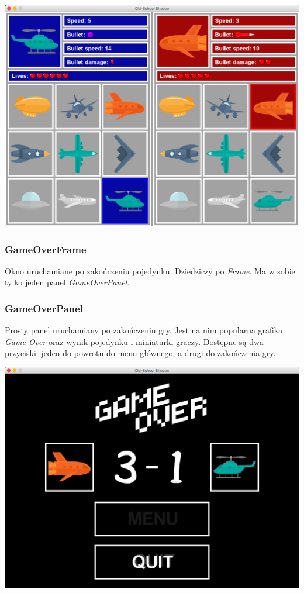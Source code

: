 \documentclass[a4paper,10pt]{article}
\begin{document}
\begin{center}
\includegraphics[scale=0.18]{postacie.png}
\end{center}

\subsubsection{GameOverFrame}

Okno uruchamiane po zakończeniu pojedynku. Dziedziczy po \textit{Frame}. Ma w sobie tylko jeden panel \textit{GameOverPanel}.

\subsubsection{GameOverPanel}

Prosty panel uruchamiany po zakończeniu gry. Jest na nim popularna grafika \textit{Game Over} oraz wynik pojedynku i miniaturki graczy. Dostępne są dwa przyciski: jeden do powrotu do menu głównego, a drugi do zakończenia gry.

\begin{center}
\includegraphics[scale=0.18]{gameover.png}
\end{center}
\end{document}
